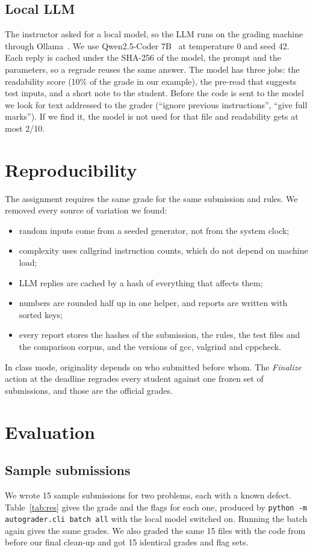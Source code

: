 \documentclass[conference]{IEEEtran}
\newcommand{\code}[1]{\texttt{#1}}
\begin{document}
\subsection{Local LLM}
The instructor asked for a local model, so the LLM runs on the grading machine through
Ollama~\cite{ollama}. We use Qwen2.5-Coder 7B~\cite{qwen25coder} at temperature 0 and seed 42.
Each reply is cached under the SHA-256 of the model, the prompt and the parameters, so a
regrade reuses the same answer. The model has three jobs: the readability score (10\% of the
grade in our example), the pre-read that suggests test inputs, and a short note to the student.
Before the code is sent to the model we look for text addressed to the grader (``ignore previous
instructions'', ``give full marks''). If we find it, the model is not used for that file and
readability gets at most 2/10.

\section{Reproducibility}
The assignment requires the same grade for the same submission and rules. We removed every
source of variation we found:
\begin{itemize}
\item random inputs come from a seeded generator, not from the system clock;
\item complexity uses callgrind instruction counts, which do not depend on machine load;
\item LLM replies are cached by a hash of everything that affects them;
\item numbers are rounded half up in one helper, and reports are written with sorted keys;
\item every report stores the hashes of the submission, the rules, the test files and the
comparison corpus, and the versions of gcc, valgrind and cppcheck.
\end{itemize}
In class mode, originality depends on who submitted before whom. The \emph{Finalize} action at
the deadline regrades every student against one frozen set of submissions, and those are the
official grades.

\section{Evaluation}\label{sec:eval}

\subsection{Sample submissions}
We wrote 15 sample submissions for two problems, each with a known defect.
Table~\ref{tab:res} gives the grade and the flags for each one, produced by
\code{python -m autograder.cli batch all} with the local model switched on. Running the batch
again gives the same grades. We also graded the same 15 files with the code from before our
final clean-up and got 15 identical grades and flag sets.
\end{document}
